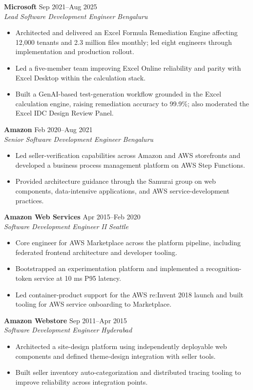 \documentclass[11pt,a4paper]{article}
\newcommand{\resumeRole}[4]{
  \textbf{#1} \hfill #2\\
  \textit{#3} \hfill \textit{#4}
}
\begin{document}
\resumeRole{Microsoft}{Sep 2021--Aug 2025}{Lead Software Development Engineer}{Bengaluru}
\begin{itemize}
    \item Architected and delivered an Excel Formula Remediation Engine affecting 12,000 tenants and 2.3 million files monthly; led eight engineers through implementation and production rollout.
    \item Led a five-member team improving Excel Online reliability and parity with Excel Desktop within the calculation stack.
    \item Built a GenAI-based test-generation workflow grounded in the Excel calculation engine, raising remediation accuracy to 99.9\%; also moderated the Excel IDC Design Review Panel.
\end{itemize}

\resumeRole{Amazon}{Feb 2020--Aug 2021}{Senior Software Development Engineer}{Bengaluru}
\begin{itemize}
    \item Led seller-verification capabilities across Amazon and AWS storefronts and developed a business process management platform on AWS Step Functions.
    \item Provided architecture guidance through the Samurai group on web components, data-intensive applications, and AWS service-development practices.
\end{itemize}

\resumeRole{Amazon Web Services}{Apr 2015--Feb 2020}{Software Development Engineer II}{Seattle}
\begin{itemize}
    \item Core engineer for AWS Marketplace across the platform pipeline, including federated frontend architecture and developer tooling.
    \item Bootstrapped an experimentation platform and implemented a recognition-token service at 10 ms P95 latency.
    \item Led container-product support for the AWS re:Invent 2018 launch and built tooling for AWS service onboarding to Marketplace.
\end{itemize}

\resumeRole{Amazon Webstore}{Sep 2011--Apr 2015}{Software Development Engineer}{Hyderabad}
\begin{itemize}
    \item Architected a site-design platform using independently deployable web components and defined theme-design integration with seller tools.
    \item Built seller inventory auto-categorization and distributed tracing tooling to improve reliability across integration points.
\end{itemize}
\end{document}
